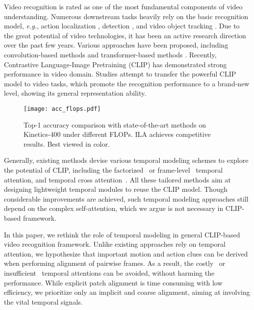 \documentclass[10pt,twocolumn,letterpaper]{article}
\begin{document}
\noindent Video recognition is rated as one of the most fundamental components of video understanding. 
Numerous downstream tasks heavily rely on the basic recognition model, \emph{e.g.}, action localization \cite{cheng2017video2shop,chao2018rethinking,shi2021temporal,shi2020weakly,shou2016temporal}, detection \cite{cheng2017video,cheng2016video,hou2017tube,li2018recurrent,deng2020single}, and video object tracking \cite{he2023damo,wang2019fast,wang2022omnivl}.
Due to the great potential of video technologies, it has been an active research direction over the past few years.
Various approaches have been proposed, including convolution-based methods \cite{b1,b2,b4,b5,b9,b11,b12,wu2020dynamic} and transformer-based methods \cite{b17,b13,cheng2022gsrformer,b16,b18,b15,tian2023resformer,xing2023svformer}.
Recently, Contrastive Language-Image Pretraining (CLIP) \cite{b21} has demonstrated strong performance in video domain.
Studies \cite{b22,b23,b24,b25,pan2022st,yang2023aim,weng2023transforming} attempt to transfer the powerful CLIP model to video tasks, which promote the recognition performance to a brand-new level, showing its general representation ability.

\begin{figure}[t]
\begin{center}
\texttt{[image: acc\_flops.pdf]}
\end{center}
   \caption{Top-1 accuracy comparison with state-of-the-art methods on Kinetics-400 \cite{b46} under different FLOPs. ILA achieves competitive results. Best viewed in color.}
\label{fig:acc_flops}
\vspace{-0.2cm}
\end{figure}

Generally, existing methods devise various temporal modeling schemes to explore the potential of CLIP, including the factorized~\cite{yang2023aim} or frame-level~\cite{b24,b23} temporal attention, and temporal cross attention~\cite{b25}.
All these tailored methods aim at designing lightweight temporal modules to reuse the CLIP model.
Though considerable improvements are achieved, such temporal modeling approaches still depend on the complex self-attention, which we argue is not necessary in CLIP-based framework.


In this paper, we rethink the role of temporal modeling in general CLIP-based video recognition framework. Unlike existing approaches rely on temporal attention, we hypothesize that important motion and action clues can be derived when performing alignment of pairwise frames.
As a result, the costly~\cite{b15,b13} or insufficient~\cite{b24,b23,b25} temporal attentions can be avoided, without harming the performance.
While explicit patch alignment is time consuming with low efficiency, we prioritize only an implicit and coarse alignment, aiming at involving the vital temporal signals.
\end{document}
